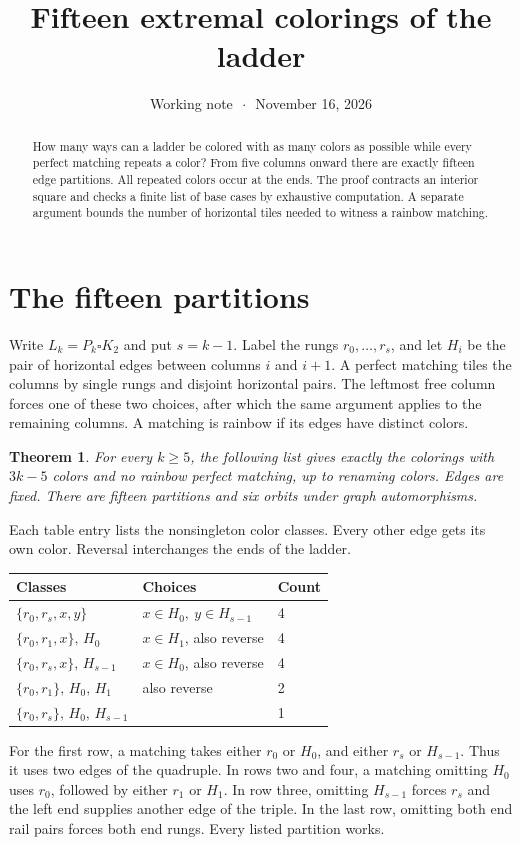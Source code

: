 \documentclass[11pt]{article}
\title{\LARGE\bfseries Fifteen extremal colorings of the ladder}
\author{}
\date{Working note \(\,\cdot\,\) November 16, 2026}
\newtheorem{theorem}{Theorem}
\begin{document}
\maketitle
\begin{abstract}
How many ways can a ladder be colored with as many colors as possible while
every perfect matching repeats a color? From five columns onward there are
exactly fifteen edge partitions. All repeated colors occur at the ends.
The proof contracts an interior square and checks a finite list of base cases
by exhaustive computation. A separate argument bounds the number of horizontal
tiles needed to witness a rainbow matching.
\end{abstract}

\section{The fifteen partitions}
Write \(L_k=P_k\square K_2\) and put \(s=k-1\). Label the rungs
\(r_0,\ldots,r_s\), and let \(H_i\) be the pair of horizontal edges between
columns \(i\) and \(i+1\). A perfect matching tiles the columns by single
rungs and disjoint horizontal pairs. The leftmost free column forces one of
these two choices, after which the same argument applies to the remaining
columns. A matching is rainbow if its edges have distinct colors.

\begin{theorem}
For every \(k\ge5\), the following list gives exactly the colorings with
\(3k-5\) colors and no rainbow perfect matching, up to renaming colors.
Edges are fixed. There are fifteen partitions and six orbits under graph
automorphisms.
\end{theorem}
Each table entry lists the nonsingleton color classes. Every other edge
gets its own color. Reversal interchanges the ends of the ladder.
\begin{center}\small
\begin{tabular}{@{}lll@{}}
\toprule
Classes & Choices & Count\\
\midrule
\(\{r_0,r_s,x,y\}\) & \(x\in H_0,\ y\in H_{s-1}\) & 4\\
\(\{r_0,r_1,x\},\,H_0\) & \(x\in H_1\), also reverse & 4\\
\(\{r_0,r_s,x\},\,H_{s-1}\) & \(x\in H_0\), also reverse & 4\\
\(\{r_0,r_1\},\,H_0,\,H_1\) & also reverse & 2\\
\(\{r_0,r_s\},\,H_0,\,H_{s-1}\) & & 1\\
\bottomrule
\end{tabular}
\end{center}
For the first row, a matching takes either \(r_0\) or \(H_0\), and either
\(r_s\) or \(H_{s-1}\). Thus it uses two edges of the quadruple. In rows two
and four, a matching omitting \(H_0\) uses \(r_0\), followed by either
\(r_1\) or \(H_1\). In row three, omitting \(H_{s-1}\) forces \(r_s\) and
the left end supplies another edge of the triple. In the last row, omitting
both end rail pairs forces both end rungs. Every listed partition works.
\end{document}
